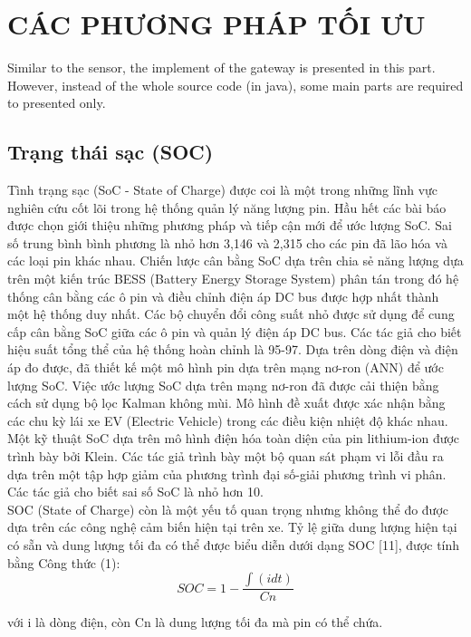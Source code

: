 \documentclass[a4paper,11pt]{article}
\theoremstyle{mytheor}
\begin{document}
\section{CÁC PHƯƠNG PHÁP TỐI ƯU }
Similar to the sensor, the implement of the gateway is presented in this part. However, instead of the whole source code (in java), some main parts are required to presented only.


\subsection{Trạng thái sạc (SOC)}
Tình trạng sạc (SoC - State of Charge) được coi là một trong những lĩnh vực nghiên cứu cốt lõi trong hệ thống quản lý năng lượng pin. Hầu hết các bài báo được chọn giới thiệu những phương pháp và tiếp cận mới để ước lượng SoC. Sai số trung bình bình phương là nhỏ hơn 3,146 và 2,315 cho các pin đã lão hóa và các loại pin khác nhau. Chiến lược cân bằng SoC dựa trên chia sẻ năng lượng dựa trên một kiến trúc BESS (Battery Energy Storage System) phân tán trong đó hệ thống cân bằng các ô pin và điều chỉnh điện áp DC bus được hợp nhất thành một hệ thống duy nhất. Các bộ chuyển đổi công suất nhỏ được sử dụng để cung cấp cân bằng SoC giữa các ô pin và quản lý điện áp DC bus. Các tác giả cho biết hiệu suất tổng thể của hệ thống hoàn chỉnh là 95-97. Dựa trên dòng điện và điện áp đo được, đã thiết kế một mô hình pin dựa trên mạng nơ-ron (ANN) để ước lượng SoC. Việc ước lượng SoC dựa trên mạng nơ-ron đã được cải thiện bằng cách sử dụng bộ lọc Kalman không mùi. Mô hình đề xuất được xác nhận bằng các chu kỳ lái xe EV (Electric Vehicle) trong các điều kiện nhiệt độ khác nhau. Một kỹ thuật SoC dựa trên mô hình điện hóa toàn diện của pin lithium-ion được trình bày bởi Klein. Các tác giả trình bày một bộ quan sát phạm vi lỗi đầu ra dựa trên một tập hợp giảm của phương trình đại số-giải phương trình vi phân. Các tác giả cho biết sai số SoC là nhỏ hơn 10.\\

SOC (State of Charge) còn là một yếu tố quan trọng nhưng không thể đo được dựa trên các công nghệ cảm biến hiện tại trên xe. Tỷ lệ giữa dung lượng hiện tại có sẵn và dung lượng tối đa có thể được biểu diễn dưới dạng SOC [11], được tính bằng Công thức (1):\\
\[SOC = 1 - \frac{\int(idt)}{Cn}\]

với i là dòng điện, còn Cn là dung lượng tối đa mà pin có thể chứa. \\
\end{document}
